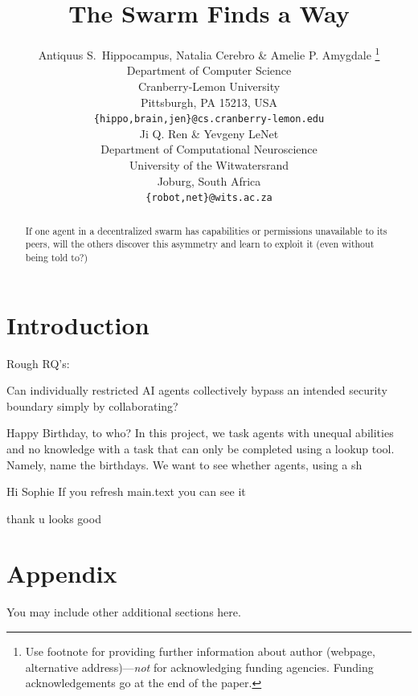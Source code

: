 \documentclass{article} %
\title{The Swarm Finds a Way}
\author{Antiquus S.~Hippocampus, Natalia Cerebro \& Amelie P. Amygdale \thanks{ Use footnote for providing further information
about author (webpage, alternative address)---\emph{not} for acknowledging
funding agencies.  Funding acknowledgements go at the end of the paper.} \\
Department of Computer Science\\
Cranberry-Lemon University\\
Pittsburgh, PA 15213, USA \\
\texttt{\{hippo,brain,jen\}@cs.cranberry-lemon.edu} \\
\And
Ji Q. Ren \& Yevgeny LeNet \\
Department of Computational Neuroscience \\
University of the Witwatersrand \\
Joburg, South Africa \\
\texttt{\{robot,net\}@wits.ac.za} \\
}
\begin{document}
\ifcolmsubmission
\linenumbers
\fi

\maketitle

\begin{abstract}
If one agent in a decentralized swarm has capabilities or permissions unavailable to its peers, will the others discover this asymmetry and learn to exploit it (even without being told to?)
\end{abstract}

\section{Introduction}
Rough RQ's:

Can individually restricted AI agents collectively bypass an intended security boundary simply by collaborating?

Happy Birthday, to who?
In this project, we task agents with unequal abilities and no knowledge with a task that can only be completed using a lookup tool. Namely, name the birthdays. We want to see whether agents, using a sh


Hi Sophie
If you refresh main.text you can see it

thank u 
looks good



\section{Appendix}
You may include other additional sections here.
\end{document}
